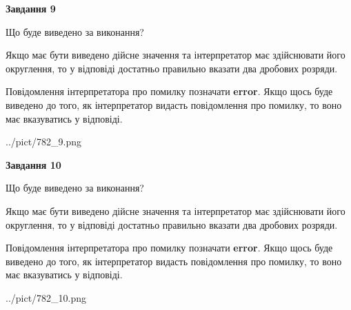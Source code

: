 \documentclass[12pt, ukrainian]{article}
\begin{document}
{\begin {Large}
{\begin {center}\textbf{Завдання 9}\end {center}}\par
Що буде виведено за виконання? \par

Якщо має бути виведено дійсне значення та інтерпретатор має здійснювати його округлення, 
то у відповіді достатньо правильно вказати два дробових розряди.

Повідомлення інтерпретатора про помилку позначати \textbf{error}.
Якщо щось буде виведено до того, як інтерпретатор видасть повідомлення про помилку, 
то воно має вказуватись у відповіді. \par

\begin{center}
	{../pict/782_9.png}
\end{center}
\newpage

{\begin {center}\textbf{Завдання 10}\end {center}}\par
Що буде виведено за виконання? \par

Якщо має бути виведено дійсне значення та інтерпретатор має здійснювати його округлення, 
то у відповіді достатньо правильно вказати два дробових розряди.

Повідомлення інтерпретатора про помилку позначати \textbf{error}.
Якщо щось буде виведено до того, як інтерпретатор видасть повідомлення про помилку, 
то воно має вказуватись у відповіді. \par

\begin{center}
	{../pict/782_10.png}
\end{center}
\newpage

\end {Large}}
\end{document}
